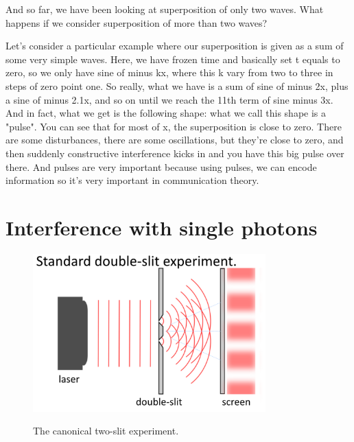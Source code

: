 And so far, we have been looking at superposition of only two waves. What happens if we consider superposition of more than two waves?

Let's consider a particular example where our superposition is given as a sum of some very simple waves. Here, we have frozen time and basically set t equals to zero, so we only have sine of minus kx, where this k vary from two to three in steps of zero point one. So really, what we have is a sum of sine of minus 2x, plus a sine of minus 2.1x, and so on until we reach the 11th term of sine minus 3x. And in fact, what we get is the following shape: what we call this shape is a "pulse". You can see that for most of x, the superposition is close to zero. There are some disturbances, there are some oscillations, but they're close to zero, and then suddenly constructive interference kicks in and you have this big pulse over there. And pulses are very important because using pulses, we can encode information so it's very important in communication theory.

\section{Interference with single photons}

\begin{figure}[H]
   \centering
    \includegraphics[width=0.8\textwidth]{lesson6/standard_double_slit.pdf}
    \label{fig: 1}
    
        \caption{The canonical two-slit experiment.}
    
\end{figure}

